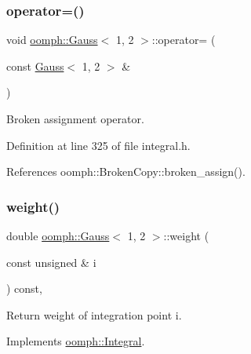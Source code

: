 \mbox{\label{classoomph_1_1Gauss_3_011_00_012_01_4_adabe823a74391845444b462a00c55c60}} 
\subsubsection{\texorpdfstring{operator=()}{operator=()}}
{\footnotesize\ttfamily void \hyperlink{classoomph_1_1Gauss}{oomph\+::\+Gauss}$<$ 1, 2 $>$\+::operator= (\begin{DoxyParamCaption}\item[{const \hyperlink{classoomph_1_1Gauss}{Gauss}$<$ 1, 2 $>$ \&}]{ }\end{DoxyParamCaption})\hspace{0.3cm}{\ttfamily [inline]}}



Broken assignment operator. 



Definition at line 325 of file integral.\+h.



References oomph\+::\+Broken\+Copy\+::broken\+\_\+assign().

\mbox{\label{classoomph_1_1Gauss_3_011_00_012_01_4_af9d4550c69b33df7560d23b98663d1f8}} 
\subsubsection{\texorpdfstring{weight()}{weight()}}
{\footnotesize\ttfamily double \hyperlink{classoomph_1_1Gauss}{oomph\+::\+Gauss}$<$ 1, 2 $>$\+::weight (\begin{DoxyParamCaption}\item[{const unsigned \&}]{i }\end{DoxyParamCaption}) const\hspace{0.3cm}{\ttfamily [inline]}, {\ttfamily [virtual]}}



Return weight of integration point i. 



Implements \hyperlink{classoomph_1_1Integral_ac65335e2aab120b285b3d6c294507b06}{oomph\+::\+Integral}.



